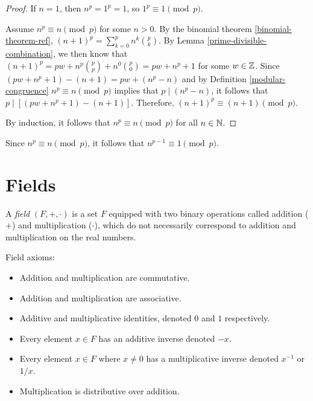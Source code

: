\begin{proof}
    If $n = 1$, then $n^p = 1^p = 1$, so $1^p \equiv 1 \pmod p$.

    Assume $n^p \equiv n \pmod p$ for some $n > 0$. By the binomial theorem \ref{binomial-theorem-ref}, $(n+1)^p = \sum_{k=0}^pn^k\binom{p}{k}$. By Lemma \ref{prime-divisible-combination}, we then know that $(n+1)^p = pw + n^p\binom{p}{p} + n^0\binom{p}{0} = pw + n^p + 1$ for some $w \in \mathbb{Z}$. Since $(pw + n^p + 1) - (n + 1) = pw + (n^p - n)$ and by Definition \ref{modular-congruence} $n^p \equiv n \pmod p$ implies that $p \mid (n^p - n)$, it follows that $p \mid \left[(pw + n^p + 1) - (n + 1)\right]$. Therefore, $(n+1)^p \equiv (n+1) \pmod p$.

    By induction, it follows that $n^p \equiv n \pmod p$ for all $n \in \mathbb{N}$.
\end{proof}

\begin{cor}\label{fermat-little-corallary}
    Since $n^p \equiv n \pmod p$, it follows that $n^{p-1} \equiv 1 \pmod p$.
\end{cor}

\section{Fields}

\begin{defn}
    A \emph{field} $(F, +, \cdot)$ is a set $F$ equipped with two binary operations called addition ($+$) and multiplication ($\cdot$), which do not necessarily correspond to addition and multiplication on the real numbers.

    Field axioms:
    \begin{itemize}
        \item Addition and multiplication are commutative.
        \item Addition and multiplication are associative.
        \item Additive and multiplicative identities, denoted $0$ and $1$ respectively.
        \item Every element $x \in F$ has an additive inverse denoted $-x$.
        \item Every element $x \in F$ where $x \neq 0$ has a multiplicative inverse denoted $x^{-1}$ or $1/x$.
        \item Multiplication is distributive over addition.
    \end{itemize}
\end{defn}

